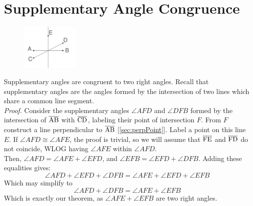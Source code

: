 \documentclass{report}
\begin{document}
\section{Supplementary Angle Congruence}
\label{sec:180}
\begin{figure} %
    \centering
    \includegraphics[width=0.25\textwidth]{supp}
\end{figure}
Supplementary angles are congruent to two right angles. Recall that supplementary angles are the angles formed by the intersection of two lines which share a common line segment.
\\[\baselineskip]
\textit{Proof.} Consider the supplementary angles $\angle AFD$ and $\angle DFB$ formed by the intersection of $\overline{\rm AB}$ with $\overline{\rm CD}$, labeling their point of intersection $F$. From $F$ construct a line perpendicular to $\overline{\rm AB}$ [\ref{sec:perpPoint}]. Label a point on this line $E$. If $\angle AFD \cong \angle AFE$, the proof is trivial, so we will assume that $\overline{\rm FE}$ and $\overline{\rm FD}$ do not coincide, WLOG having $\angle AFE$ within $\angle AFD$.
\\Then, $\angle AFD = \angle AFE + \angle EFD$, and $\angle EFB = \angle EFD + \angle DFB$. Adding these equalities gives: \begin{displaymath}
\angle AFD + \angle EFD + \angle DFB = \angle AFE + \angle EFD + \angle EFB
\end{displaymath}
Which may simplify to\begin{displaymath}
\angle AFD +\angle DFB = \angle AFE + \angle EFB
\end{displaymath}
Which is exactly our theorem, as  $\angle AFE + \angle EFB$ are two right angles.
\end{document}
